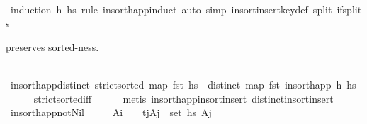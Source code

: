 \begin{isabellebody}
%
\isadelimproof
\ \ \ \ %
\endisadelimproof
%
\isatagproof
{}\isamarkupfalse%
\ {\isacharparenleft}{\kern0pt}induction\ h\ hs\ rule{\isacharcolon}{\kern0pt}\ insort{\isacharunderscore}{\kern0pt}happ{\isachardot}{\kern0pt}induct{\isacharparenright}{\kern0pt}\ {\isacharparenleft}{\kern0pt}auto\ simp{\isacharcolon}{\kern0pt}\ insort{\isacharunderscore}{\kern0pt}insert{\isacharunderscore}{\kern0pt}key{\isacharunderscore}{\kern0pt}def\ split{\isacharcolon}{\kern0pt}\ if{\isacharunderscore}{\kern0pt}splits{\isacharparenright}{\kern0pt}%
\endisatagproof
{\isafoldproof}%
%
\isadelimproof
%
\endisadelimproof
%
\begin{isamarkuptext}%
 preserves sorted-ness.%
\end{isamarkuptext}\isamarkuptrue%
\ \ \isamarkupfalse%
\ insort{\isacharunderscore}{\kern0pt}happ{\isacharunderscore}{\kern0pt}distinct{\isacharcolon}{\kern0pt}\ {\isachardoublequoteopen}strict{\isacharunderscore}{\kern0pt}sorted\ {\isacharparenleft}{\kern0pt}map\ fst\ hs{\isacharparenright}{\kern0pt}\ {\isasymLongrightarrow}\ distinct\ {\isacharparenleft}{\kern0pt}map\ fst\ {\isacharparenleft}{\kern0pt}insort{\isacharunderscore}{\kern0pt}happ\ h\ hs{\isacharparenright}{\kern0pt}{\isacharparenright}{\kern0pt}{\isachardoublequoteclose}\isanewline
%
\isadelimproof
\ \ \ \ %
\endisadelimproof
%
\isatagproof
{}\isamarkupfalse%
\ strict{\isacharunderscore}{\kern0pt}sorted{\isacharunderscore}{\kern0pt}iff\isanewline
\ \ \ \ \isamarkupfalse%
\ {\isacharparenleft}{\kern0pt}metis\ insort{\isacharunderscore}{\kern0pt}happ{\isacharunderscore}{\kern0pt}insort{\isacharunderscore}{\kern0pt}insert\ distinct{\isacharunderscore}{\kern0pt}insort{\isacharunderscore}{\kern0pt}insert{\isacharparenright}{\kern0pt}%
\endisatagproof
{\isafoldproof}%
%
\isadelimproof
\isanewline
%
\endisadelimproof
\isanewline
\ \ \isamarkupfalse%
\ insort{\isacharunderscore}{\kern0pt}happ{\isacharunderscore}{\kern0pt}not{\isacharunderscore}{\kern0pt}Nil{\isacharcolon}{\kern0pt}\isanewline
\ \ \ \ \ {\isachardoublequoteopen}A\isactrlsub i\ {\isasymnoteq}\ {\isacharbrackleft}{\kern0pt}{\isacharbrackright}{\kern0pt}{\isachardoublequoteclose}\ \ {\isachardoublequoteopen}{\isasymforall}{\isacharparenleft}{\kern0pt}t\isactrlsub j{\isacharcomma}{\kern0pt}A\isactrlsub j{\isacharparenright}{\kern0pt}\ {\isasymin}\ set\ hs{\isachardot}{\kern0pt}\ A\isactrlsub j\ {\isasymnoteq}\ {\isacharbrackleft}{\kern0pt}{\isacharbrackright}{\kern0pt}{\isachardoublequoteclose}\ \isanewline

\end{isabellebody}
